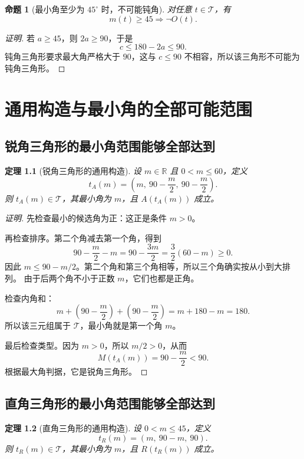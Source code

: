 \documentclass[UTF8,a4paper,zihao=-4,oneside,openany,fontset=fandol]{ctexbook}
\newtheorem{theorem}{定理}[chapter]
\newtheorem{proposition}[theorem]{命题}
\theoremstyle{definition}
\theoremstyle{remark}
\begin{document}
\begin{proposition}[最小角至少为 $45^\circ$ 时，不可能钝角]
对任意 $t\in\mathcal T$，有
\[
m(t)\ge45\Longrightarrow\neg O(t).
\]
\end{proposition}

\begin{proof}[证明]
若 $a\ge45$，则 $2a\ge90$，于是
\[
c\le180-2a\le90.
\]
钝角三角形要求最大角严格大于 $90$，这与 $c\le90$ 不相容，所以该三角形不可能为钝角三角形。
\end{proof}

\chapter{通用构造与最小角的全部可能范围}
\label{math:constructions}

\section{锐角三角形的最小角范围能够全部达到}

\begin{theorem}[锐角三角形的通用构造]
设 $m\in\mathbb R$ 且 $0<m\le60$，定义
\[
t_A(m)=\left(m,\ 90-\frac m2,\ 90-\frac m2\right).
\]
则 $t_A(m)\in\mathcal T$，其最小角为 $m$，且 $A(t_A(m))$ 成立。
\end{theorem}

\begin{proof}[证明]
先检查最小的候选角为正：这正是条件 $m>0$。

再检查排序。第二个角减去第一个角，得到
\[
90-\frac m2-m
=90-\frac{3m}{2}
=\frac32(60-m)\ge0.
\]
因此 $m\le90-m/2$。第二个角和第三个角相等，所以三个角确实按从小到大排列。
由于后两个角不小于正数 $m$，它们也都是正角。

检查内角和：
\[
m+\left(90-\frac m2\right)+\left(90-\frac m2\right)
=m+180-m=180.
\]
所以该三元组属于 $\mathcal T$，最小角就是第一个角 $m$。

最后检查类型。因为 $m>0$，所以 $m/2>0$，从而
\[
M(t_A(m))=90-\frac m2<90.
\]
根据最大角判据，它是锐角三角形。
\end{proof}

\section{直角三角形的最小角范围能够全部达到}

\begin{theorem}[直角三角形的通用构造]
设 $0<m\le45$，定义
\[
t_R(m)=(m,\ 90-m,\ 90).
\]
则 $t_R(m)\in\mathcal T$，其最小角为 $m$，且 $R(t_R(m))$ 成立。
\end{theorem}
\end{document}
